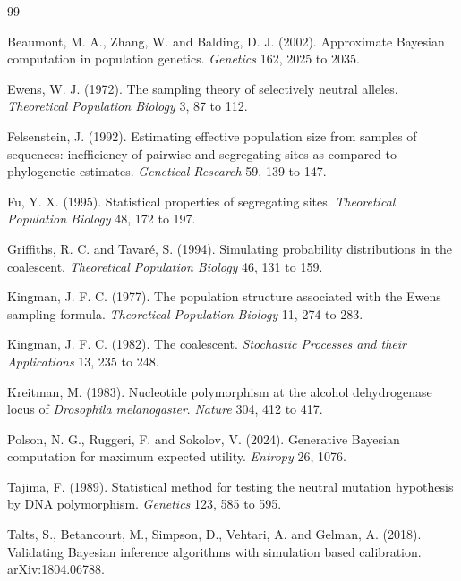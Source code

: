 \begin{thebibliography}{99}

Beaumont, M. A., Zhang, W. and Balding, D. J. (2002). Approximate Bayesian computation in population genetics. \emph{Genetics} 162, 2025 to 2035.

Ewens, W. J. (1972). The sampling theory of selectively neutral alleles. \emph{Theoretical Population Biology} 3, 87 to 112.

Felsenstein, J. (1992). Estimating effective population size from samples of sequences: inefficiency of pairwise and segregating sites as compared to phylogenetic estimates. \emph{Genetical Research} 59, 139 to 147.

Fu, Y. X. (1995). Statistical properties of segregating sites. \emph{Theoretical Population Biology} 48, 172 to 197.

Griffiths, R. C. and Tavar\'e, S. (1994). Simulating probability distributions in the coalescent. \emph{Theoretical Population Biology} 46, 131 to 159.

Kingman, J. F. C. (1977). The population structure associated with the Ewens sampling formula. \emph{Theoretical Population Biology} 11, 274 to 283.

Kingman, J. F. C. (1982). The coalescent. \emph{Stochastic Processes and their Applications} 13, 235 to 248.

Kreitman, M. (1983). Nucleotide polymorphism at the alcohol dehydrogenase locus of \emph{Drosophila melanogaster}. \emph{Nature} 304, 412 to 417.

Polson, N. G., Ruggeri, F. and Sokolov, V. (2024). Generative Bayesian computation for maximum expected utility. \emph{Entropy} 26, 1076.

Tajima, F. (1989). Statistical method for testing the neutral mutation hypothesis by DNA polymorphism. \emph{Genetics} 123, 585 to 595.

Talts, S., Betancourt, M., Simpson, D., Vehtari, A. and Gelman, A. (2018). Validating Bayesian inference algorithms with simulation based calibration. arXiv:1804.06788.


\end{thebibliography}
